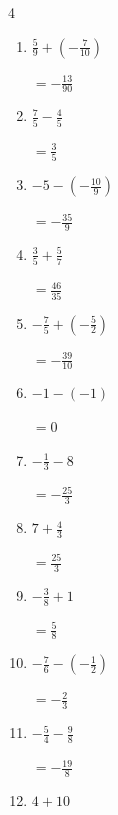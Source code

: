 \begin{multicols}{4}
\begin{enumerate}
        $\displaystyle =-3$

  \item $\displaystyle \frac{5}{9} + \left(-\frac{7}{10}\right)$

        $\displaystyle =-\frac{13}{90}$

  \item $\displaystyle \frac{7}{5} - \frac{4}{5}$

        $\displaystyle =\frac{3}{5}$

  \item $\displaystyle -5 - \left(-\frac{10}{9}\right)$

        $\displaystyle =-\frac{35}{9}$

  \item $\displaystyle \frac{3}{5} + \frac{5}{7}$

        $\displaystyle =\frac{46}{35}$

  \item $\displaystyle -\frac{7}{5} + \left(-\frac{5}{2}\right)$

        $\displaystyle =-\frac{39}{10}$

  \item $\displaystyle -1 - \left(-1\right)$

        $\displaystyle =0$

  \item $\displaystyle -\frac{1}{3} - 8$

        $\displaystyle =-\frac{25}{3}$

\columnbreak %

\resetques

  \item $\displaystyle 7 + \frac{4}{3}$

        $\displaystyle =\frac{25}{3}$

  \item $\displaystyle -\frac{3}{8} + 1$

        $\displaystyle =\frac{5}{8}$

  \item $\displaystyle -\frac{7}{6} - \left(-\frac{1}{2}\right)$

        $\displaystyle =-\frac{2}{3}$

  \item $\displaystyle -\frac{5}{4} - \frac{9}{8}$

        $\displaystyle =-\frac{19}{8}$

  \item $\displaystyle 4 + 10$


\end{enumerate}
\end{multicols}
